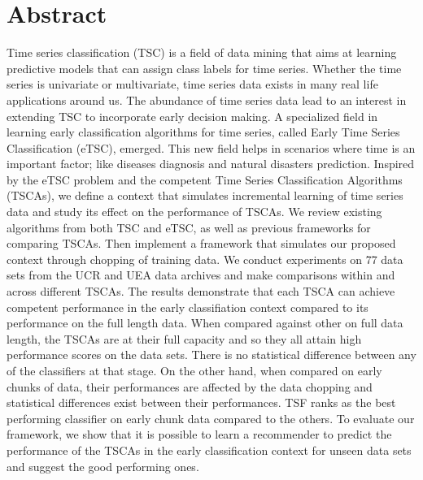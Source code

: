 
\setcounter{page}{1}
\section*{Abstract}
\thispagestyle{empty}
Time series classification (TSC) is a field of data mining that aims at learning predictive models that can assign class labels for time series.
Whether the time series is univariate or multivariate, time series data exists in many real life applications around us.
The abundance of time series data lead to an interest in extending TSC to incorporate early decision making.
A specialized field in learning early classification algorithms for time series, called Early Time Series Classification (eTSC), emerged.
This new field helps in scenarios where time is an important factor; like diseases diagnosis and natural disasters prediction.
Inspired by the eTSC problem and the competent Time Series Classification Algorithms (TSCAs), we define a context that simulates incremental learning of time series data and study its effect on the performance of TSCAs.
We review existing algorithms from both TSC and eTSC, as well as previous frameworks for comparing TSCAs.
Then implement a framework that simulates our proposed context through chopping of training data.
We conduct experiments on 77 data sets from the UCR and UEA data archives and make comparisons within and across different TSCAs.
The results demonstrate that each TSCA can achieve competent performance in the early classifiation context compared to its performance on the full length data.
When compared against other on full data length, the TSCAs are at their full capacity and so they all attain high performance scores on the data sets.
There is no statistical difference between any of the classifiers at that stage.
On the other hand, when compared on early chunks of data, their performances are affected by the data chopping and statistical differences exist between their performances.
TSF ranks as the best performing classifier on early chunk data compared to the others.
To evaluate our framework, we show that it is possible to learn a recommender to predict the performance of the TSCAs in the early classification context for unseen data sets
and suggest the good performing ones.

\null\newpage

